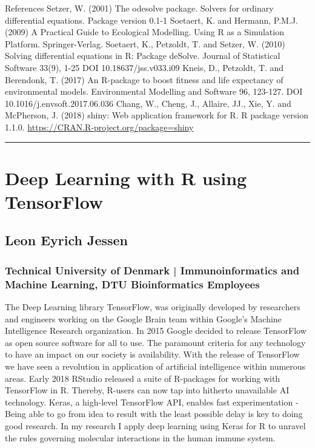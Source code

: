\documentclass [12pt]{article}
\begin{document}
References \newline
[1] Setzer, W. (2001) The odesolve package. Solvers for ordinary differential equations. Package version 0.1-1 \newline
[2] Soetaert, K. and Hermann, P.M.J. (2009) A Practical Guide to Ecological Modelling. Using R as a Simulation Platform. Springer-Verlag. \newline
[3] Soetaert, K., Petzoldt, T. and Setzer, W. (2010) Solving differential equations in R: Package deSolve. Journal of Statistical Software 33(9), 1-25 DOI 10.18637/jss.v033.i09 \newline
[4] Kneis, D., Petzoldt, T. and Berendonk, T. (2017) An R-package to boost fitness and life expectancy of environmental models. Environmental Modelling and Software 96, 123-127. DOI 10.1016/j.envsoft.2017.06.036 \newline
[5] Chang, W., Cheng, J., Allaire, JJ., Xie, Y. and McPherson, J. (2018) shiny: Web application framework for R. R package version 1.1.0. \url{https://CRAN.R-project.org/package=shiny}

\noindent\rule{\textwidth}{1pt}
\section{Deep Learning with R using TensorFlow}
\subsection*{Leon Eyrich Jessen}
\subsubsection*{Technical University of Denmark | Immunoinformatics and Machine Learning, DTU Bioinformatics Employees}

The Deep Learning library TensorFlow, was originally developed by researchers and engineers working on the Google Brain team within Google's Machine Intelligence Research organization. In 2015 Google decided to release TensorFlow as open source software for all to use. The paramount criteria for any technology to have an impact on our society is availability. With the release of TensorFlow we have seen a revolution in application of artificial intelligence within numerous areas. Early 2018 RStudio released a suite of R-packages for working with TensorFlow in R. Thereby, R-users can now tap into hitherto unavailable AI technology. Keras, a high-level TensorFlow API, enables fast experimentation - Being able to go from idea to result with the least possible delay is key to doing good research. In my research I apply deep learning using Keras for R to unravel the rules governing molecular interactions in the human immune system.
\newpage
{}
\end{document}
